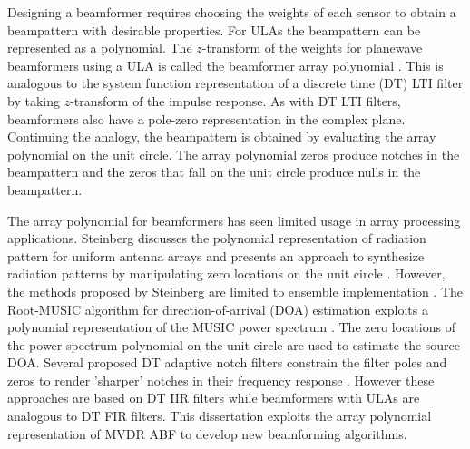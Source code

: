 Designing a beamformer requires choosing the weights of each sensor to
obtain a beampattern with desirable properties. For ULAs the
beampattern can be represented as a polynomial. The
$z$-transform of the weights for planewave beamformers using a ULA is
called the beamformer array polynomial \cite{Schelkunoff1943array,
  vtree2002oap, Steinberg1976}. This is analogous to the system
function representation of a discrete time (DT) LTI filter by taking
$z$-transform of the impulse response. As with DT LTI filters,
beamformers also have a pole-zero representation in the complex
plane. Continuing the analogy, the beampattern is obtained by
evaluating the array polynomial on the unit circle. The array
polynomial zeros produce notches in the beampattern and the zeros that
fall on the unit circle produce nulls in the beampattern.

The array polynomial for beamformers has seen limited
usage in array processing applications. Steinberg discusses the
polynomial representation of radiation pattern for uniform antenna
arrays and presents an approach to synthesize radiation patterns by
manipulating zero locations on the unit circle
\cite{Steinberg1976}. However, the methods proposed by Steinberg are
limited to ensemble implementation \cite{Steinberg1976}. The
Root-MUSIC algorithm for direction-of-arrival (DOA) estimation
exploits a polynomial representation of the MUSIC power spectrum
\cite{hwang2008root}. The zero locations of the power spectrum
polynomial on the unit circle are used to estimate the source
DOA. Several proposed DT adaptive notch filters constrain the filter
poles and zeros to render 'sharper' notches in their frequency
response \cite{Nehorai1985, Friedlander1984notch, Shynk1986}. However
these approaches are based on DT IIR filters while beamformers with
ULAs are analogous to DT FIR filters. This dissertation exploits the
array polynomial representation of MVDR ABF to develop new beamforming
algorithms.


